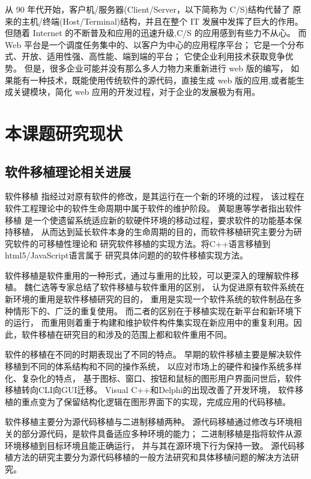 从 90 年代开始，客户机/服务器(Client/Server，以下简称为 C/S)结构代替了
原来的主机/终端(Host/Terminal)结构，并且在整个 IT 发展中发挥了巨大的作用。
但随着 Internet 的不断普及和应用的迅速升级,C/S 的应用感到有些力不从心。
而 Web 平台是一个调度任务集中的、以客户为中心的应用程序平台；
它是一个分布式、开放、适用性强、高性能、端到端的平台；
它使企业利用技术获取竞争优势。
但是，很多企业可能并没有那么多人力物力来重新进行 web 版的编写，
如果能有一种技术，既能使用传统软件的源代码，直接生成 web 版的应用,或者能生 
成关键模块，简化 web 应用的开发过程，对于企业的发展极为有用。

\section{本课题研究现状}

\subsection{软件移植理论相关进展}

软件移植
指经过对原有软件的修改，是其运行在一个新的环境的过程，
该过程在软件工程理论中的软件生命周期中属于软件的维护阶段。
黄聪惠等学者指出软件移植
是一个使遗留系统适应新的软硬件环境的移动过程，要求软件的功能基本保持移植，
从而达到延长软件本身的生命周期的目的，而软件移植研究主要分为研究软件的可移植性理论和
研究软件移植的实现方法。将C++语言移植到html5/JavaScript语言属于
研究具体问题的的软件移植实现方法。

软件移植是软件重用的一种形式，通过与重用的比较，可以更深入的理解软件移植。
魏仁选等专家总结了软件移植与软件重用的区别，
认为促进原有软件系统在新环境的重用是软件移植研究的目的，
重用是实现一个软件系统的软件制品在多种情形下的、广泛的重复使用。
而二者的区别在于移植实现在新平台和新环境下的运行，
而重用则着重于构建和维护软件构件集实现在新应用中的重复利用。因此，软件移植在研究目的和涉及的范围上都和软件重用不同。

软件的移植在不同的时期表现出了不同的特点。
早期的软件移植主要是解决软件移植到不同的体系结构和不同的操作系统，
以应对市场上的硬件和操作系统多样化、复杂化的特点，
基于图标、窗口、按钮和鼠标的图形用户界面问世后，软件移植转向CLI向GUI迁移。
Visual C++和Delphi的出现改善了开发环境，
软件移植的重点变为了保留结构化逻辑在图形界面下的实现，完成应用的代码移植。

软件移植主要分为源代码移植与二进制移植两种。
源代码移植通过修改与环境相关的部分源代码，是软件具备适应多种环境的能力；
二进制移植是指将软件从源环境移植到目标环境且能正确运行，
并与其在源环境下行为保持一致。
源代码移植方法的研究主要分为源代码移植的一般方法研究和具体移植问题的解决方法研究。

